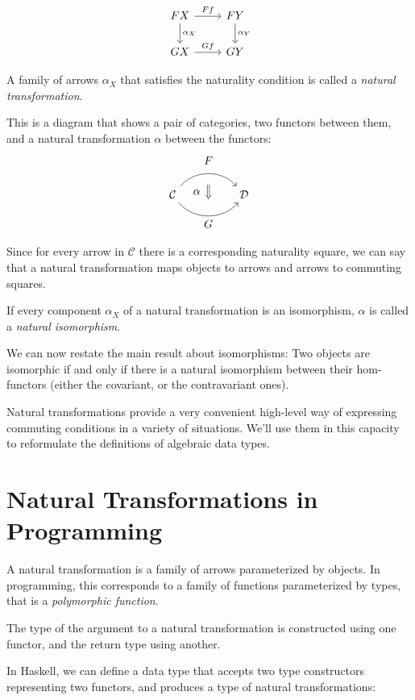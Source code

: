\documentclass[DaoFP]{subfiles}
\begin{document}
\[
 \begin{tikzcd}
 F X
 \arrow[d, "\alpha_X"]
 \arrow[r, "F f"]
 &
F Y
  \arrow[d, "\alpha_Y"]
 \\
G X
 \arrow[r, "G f"]
& G Y
 \end{tikzcd}
\]

A family of arrows $\alpha_X$ that satisfies the naturality condition is called a \emph{natural transformation}.

This is a diagram that shows a pair of categories, two functors between them, and a natural transformation $\alpha$ between the functors:
\[
\begin{tikzcd}[column sep=huge]
\mathcal{C}
  \arrow[bend left=50]{r}[name=U, label=above:$F$]{}
  \arrow[bend right=50]{r}[name=D, label=below:$G$]{} 
 &
\mathcal{D}
  \arrow[shorten <=10pt,shorten >=10pt,Rightarrow,to path={(U) -- node[label=left:$\alpha$] {} (D)}]{}
\end{tikzcd}
\]


Since for every arrow in $\mathcal{C}$ there is a corresponding naturality square, we can say that a natural transformation maps objects to arrows and arrows to commuting squares.

If every component $\alpha_X$ of a natural transformation is an isomorphism, $\alpha$ is called a \emph{natural isomorphism}. 

We can now restate the main result about isomorphisms: Two objects are isomorphic if and only if there is a natural isomorphism between their hom-functors (either the covariant, or the contravariant ones).

Natural transformations provide a very convenient high-level way of expressing commuting conditions in a variety of situations. We'll use them in this capacity to reformulate the definitions of algebraic data types.

\section{Natural Transformations in Programming}

A natural transformation is a family of arrows parameterized by objects. In programming, this corresponds to a family of functions parameterized by types, that is a \emph{polymorphic function}. 

The type of the argument to a natural transformation is constructed using one functor, and the return type using another. 

In Haskell, we can define a data type that accepts two type constructors representing two functors, and produces a type of natural transformations:
\end{document}
